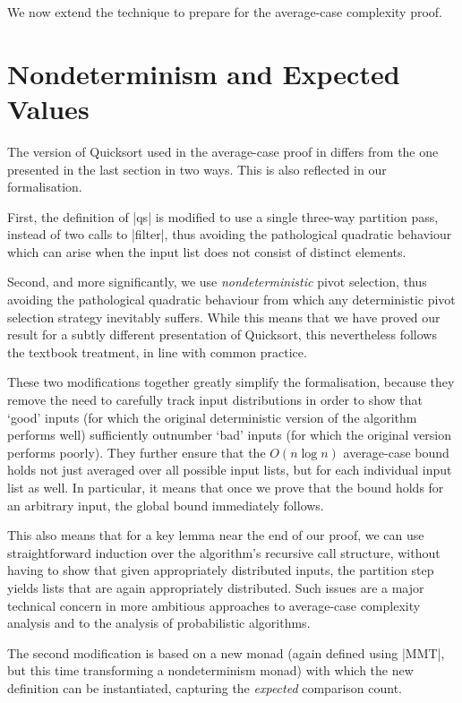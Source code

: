 \documentclass[runningheads]{llncs}
\begin{document}
We now extend the technique to prepare for the average-case complexity proof.

\section{Nondeterminism and Expected Values}
\label{nondetexpec}


The version of Quicksort used in the average-case proof in \cite{introtoalgos}
differs from the one presented in the last section in two ways. This is also
reflected in our formalisation.  

First, the definition of |qs| is modified to use a single three-way partition
pass, instead of two calls to |filter|, thus avoiding the pathological
quadratic behaviour which can arise when the input list does not consist of
distinct elements.

Second, and more significantly, we use \emph{nondeterministic} pivot
selection, thus avoiding the pathological quadratic behaviour from which
any deterministic pivot selection strategy inevitably suffers. While this
means that we have proved our result for a subtly different presentation of
Quicksort, this nevertheless follows the textbook treatment, in line with
common practice.

These two modifications together greatly simplify the formalisation, because
they remove the need to carefully track input distributions in order to show
that `good' inputs (for which the original deterministic version of the
algorithm performs well) sufficiently outnumber `bad' inputs (for which the
original version performs poorly). They further ensure that the $O(n \log n)$
average-case bound holds not just averaged over all possible input lists, but
for each individual input list as well. In particular, it means that once we
prove that the bound holds for an arbitrary input, the global bound
immediately follows.

This also means that for a key lemma near the end of our proof, we can use
straightforward induction over the algorithm's recursive call structure,
without having to show that given appropriately distributed inputs, the
partition step yields lists that are again appropriately distributed. Such
issues are a major technical concern in more ambitious approaches to
average-case complexity analysis \cite[for example]{modularcalculus} and to
the analysis of probabilistic algorithms.

The second modification is based on a new monad (again defined using |MMT|,
but this time transforming a nondeterminism monad) with which the new
definition can be instantiated, capturing the \emph{expected} comparison
count.
\end{document}
